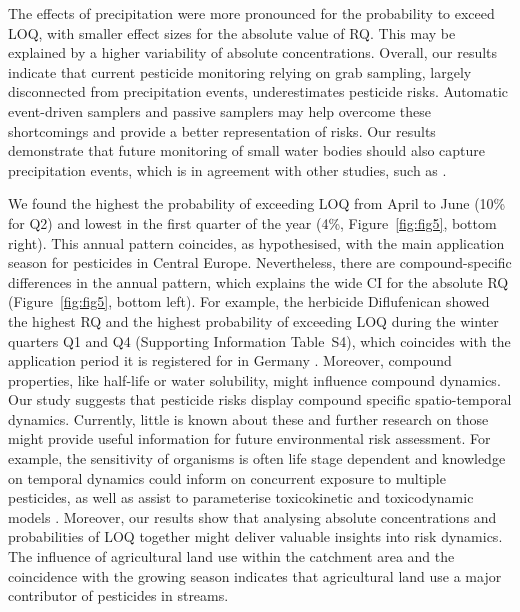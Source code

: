 \documentclass[journal=esthag,manuscript=article]{achemso}
\begin{document}
The effects of precipitation were more pronounced for the probability to exceed LOQ, with smaller effect sizes for the absolute value of RQ. 
This may be explained by a higher variability of absolute concentrations.
Overall, our results indicate that current pesticide monitoring relying on grab sampling, largely disconnected from precipitation events, underestimates pesticide risks.
Automatic event-driven samplers \citep{stehle_probabilistic_2013} and passive samplers \citep{fernandez_calibration_2014,moschet_evaluation_2015} may help overcome these shortcomings and provide a better representation of risks.
Our results demonstrate that future monitoring of small water bodies should also capture precipitation events, which is in agreement with other studies, such as \citet{lorenz_specifics_2016}. 

We found the highest the probability of exceeding LOQ from April to June (10\% for Q2) and lowest in the first quarter of the year (4\%, Figure~\ref{fig:fig5}, bottom right).
This annual pattern coincides, as hypothesised, with the main application season for pesticides in Central Europe.
Nevertheless, there are compound-specific differences in the annual pattern, which explains the wide CI for the absolute RQ (Figure~\ref{fig:fig5}, bottom left). 
For example, the herbicide Diflufenican showed the highest RQ and the highest probability of exceeding LOQ during the winter quarters Q1 and Q4 (Supporting Information Table~S4), which coincides with the application period it is registered for in Germany \citep{bvl_online_2016}.
Moreover, compound properties, like half-life or water solubility, might influence compound dynamics. 
Our study suggests that pesticide risks display compound specific spatio-temporal dynamics. 
Currently, little is known about these and further research on those might provide useful information for future environmental risk assessment. 
For example, the sensitivity of organisms is often life stage dependent \citep{hutchinson1998analysis} and knowledge on temporal dynamics could inform on concurrent exposure to multiple pesticides, as well as assist to parameterise toxicokinetic and toxicodynamic models \citep{ashauer2016modelling}. 
Moreover, our results show that analysing absolute concentrations and probabilities of LOQ together might deliver valuable insights into risk dynamics.
The influence of agricultural land use within the catchment area and the coincidence with the growing season indicates that agricultural land use a major contributor of pesticides in streams. 
\end{document}
